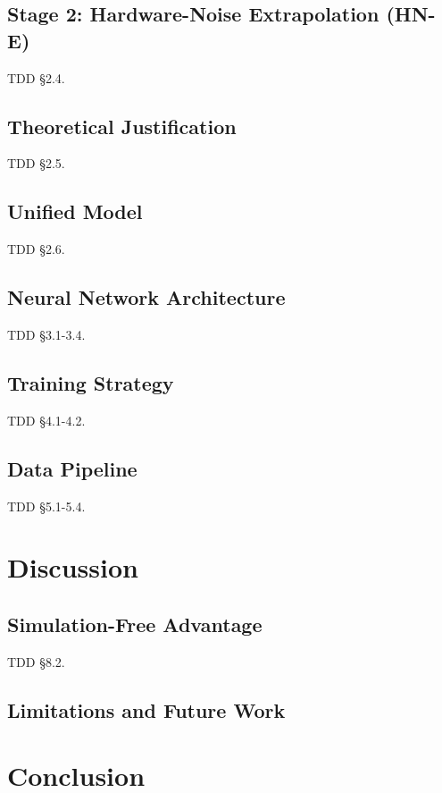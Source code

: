 ﻿\documentclass[twocolumn]{revtex4-2}
\begin{document}
\subsection{Stage 2: Hardware-Noise Extrapolation (HN-E)}
TDD §2.4.

\subsection{Theoretical Justification}
TDD §2.5.

\subsection{Unified Model}
TDD §2.6.

\subsection{Neural Network Architecture}
TDD §3.1-3.4.

\subsection{Training Strategy}
TDD §4.1-4.2.

\subsection{Data Pipeline}
TDD §5.1-5.4.

\section{Discussion}

\subsection{Simulation-Free Advantage}
TDD §8.2.

\subsection{Limitations and Future Work}

\section{Conclusion}



\end{document}
